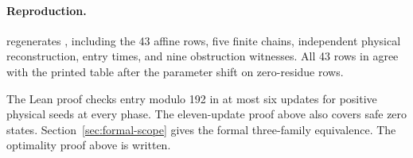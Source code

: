 \paragraph{Reproduction.}
 regenerates
, including the 43 affine rows, five finite
chains, independent physical reconstruction, entry times, and nine
obstruction witnesses. All 43 rows in  agree with
the printed table after the parameter shift on zero-residue rows.

The Lean proof checks entry modulo 192 in at most six updates for
positive physical seeds at every phase. The eleven-update proof above
also covers safe zero states. Section~\ref{sec:formal-scope} gives the
formal three-family equivalence. The optimality proof above is written.
